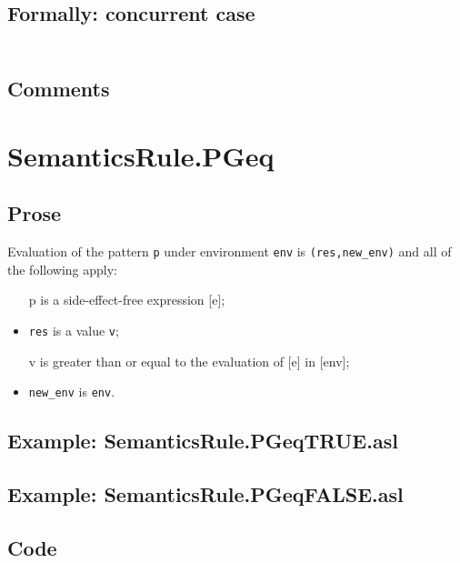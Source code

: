 \documentclass{book}
\begin{document}
    \subsection{Formally: concurrent case}
    \begin{align}
    \end{align} 

    \subsection{Comments}

\section{SemanticsRule.PGeq \label{sec:SemanticsRule.PGeq}}

    \subsection{Prose}
   Evaluation of the pattern \texttt{p} under environment \texttt{env} is
  \texttt{(res,new\_env)} and all of the following apply:
    \begin{itemize}
    \item [p] is a side-effect-free expression [e];
    \item \texttt{res} is a value \texttt{v};
    \item [v] is greater than or equal to the evaluation of [e] in [env];
    \item \texttt{new\_env} is \texttt{env}.
    \end{itemize}

    \subsection{Example: SemanticsRule.PGeqTRUE.asl}

    \subsection{Example: SemanticsRule.PGeqFALSE.asl}

  \subsection{Code}
\end{document}

